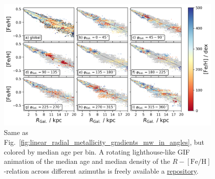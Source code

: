 \documentclass[fleqn,usenatbib]{mnras}
\begin{document}
\begin{figure}
    \centering
    \includegraphics[width=\columnwidth]{figures/radial_metallicity_gradients_mw_in_angles_age.png}
    \caption{Same as Fig.~\ref{fig:linear_radial_metallicity_gradients_mw_in_angles}, but colored by median age per bin. A rotating lighthouse-like GIF animation of the median age and median density of the $R-\mathrm{[Fe/H]}$-relation across different azimuths is freely available a \href{https://github.com/svenbuder/nihao_radial_metallicity_gradients/blob/main/figures/xyz_rfeh.gif}{repository}.}
    \label{fig:radial_metallicity_gradients_mw_in_angles_age}
\end{figure}
\end{document}
